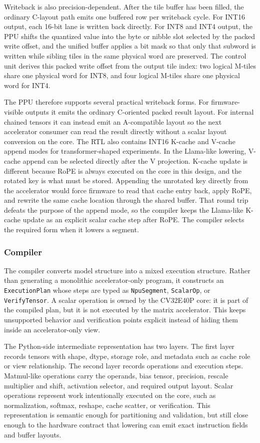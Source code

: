 \documentclass[a4paper, 12pt, titlepage]{article}
\begin{document}
Writeback is also precision-dependent. After the tile buffer has been filled, the ordinary C-layout path emits one buffered row per writeback cycle. For INT16 output, each 16-bit lane is written back directly. For INT8 and INT4 output, the PPU shifts the quantized value into the byte or nibble slot selected by the packed write offset, and the unified buffer applies a bit mask so that only that subword is written while sibling tiles in the same physical word are preserved. The control unit derives this packed write offset from the output tile index: two logical M-tiles share one physical word for INT8, and four logical M-tiles share one physical word for INT4.

The PPU therefore supports several practical writeback forms. For firmware-visible outputs it emits the ordinary C-oriented packed result layout. For internal chained tensors it can instead emit an A-compatible layout so the next accelerator consumer can read the result directly without a scalar layout conversion on the core. The RTL also contains INT16 K-cache and V-cache append modes for transformer-shaped experiments. In the Llama-like lowering, V-cache append can be selected directly after the V projection. K-cache update is different because RoPE is always executed on the core in this design, and the rotated key is what must be stored. Appending the unrotated key directly from the accelerator would force firmware to read that cache entry back, apply RoPE, and rewrite the same cache location through the shared buffer. That round trip defeats the purpose of the append mode, so the compiler keeps the Llama-like K-cache update as an explicit scalar cache step after RoPE. The compiler selects the required form when it lowers a segment.

\subsubsection{Compiler}
The compiler converts model structure into a mixed execution structure. Rather than generating a monolithic accelerator-only program, it constructs an \texttt{ExecutionPlan} whose steps are typed as \texttt{NpuSegment}, \texttt{ScalarOp}, or \texttt{VerifyTensor}. A scalar operation is owned by the CV32E40P core: it is part of the compiled plan, but it is not executed by the matrix accelerator. This keeps unsupported behavior and verification points explicit instead of hiding them inside an accelerator-only view.

The Python-side intermediate representation has two layers. The first layer records tensors with shape, dtype, storage role, and metadata such as cache role or view relationship. The second layer records operations and execution steps. Matmul-like operations carry the operands, bias tensor, precision, rescale multiplier and shift, activation selector, and required output layout. Scalar operations represent work intentionally executed on the core, such as normalization, softmax, reshape, cache scatter, or verification. This representation is semantic enough for partitioning and validation, but still close enough to the hardware contract that lowering can emit exact instruction fields and buffer layouts.
\end{document}
